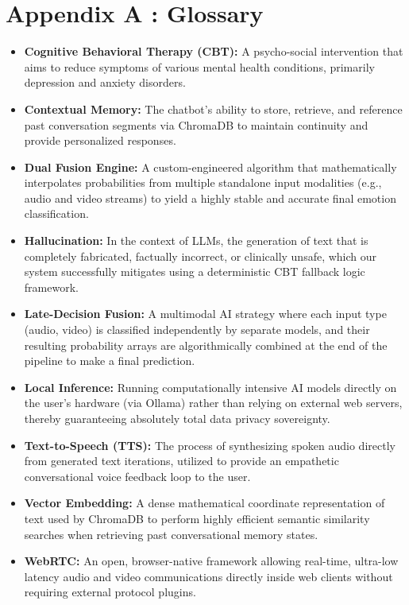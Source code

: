 \documentclass[11pt]{report}
\begin{document}
\chapter*{Appendix A : Glossary}
\begin{itemize}
    \item \textbf{Cognitive Behavioral Therapy (CBT):} A psycho-social intervention that aims to reduce symptoms of various mental health conditions, primarily depression and anxiety disorders.
    \item \textbf{Contextual Memory:} The chatbot's ability to store, retrieve, and reference past conversation segments via ChromaDB to maintain continuity and provide personalized responses.
    \item \textbf{Dual Fusion Engine:} A custom-engineered algorithm that mathematically interpolates probabilities from multiple standalone input modalities (e.g., audio and video streams) to yield a highly stable and accurate final emotion classification.
    \item \textbf{Hallucination:} In the context of LLMs, the generation of text that is completely fabricated, factually incorrect, or clinically unsafe, which our system successfully mitigates using a deterministic CBT fallback logic framework.
    \item \textbf{Late-Decision Fusion:} A multimodal AI strategy where each input type (audio, video) is classified independently by separate models, and their resulting probability arrays are algorithmically combined at the end of the pipeline to make a final prediction.
    \item \textbf{Local Inference:} Running computationally intensive AI models directly on the user's hardware (via Ollama) rather than relying on external web servers, thereby guaranteeing absolutely total data privacy sovereignty.
    \item \textbf{Text-to-Speech (TTS):} The process of synthesizing spoken audio directly from generated text iterations, utilized to provide an empathetic conversational voice feedback loop to the user.
    \item \textbf{Vector Embedding:} A dense mathematical coordinate representation of text used by ChromaDB to perform highly efficient semantic similarity searches when retrieving past conversational memory states.
    \item \textbf{WebRTC:} An open, browser-native framework allowing real-time, ultra-low latency audio and video communications directly inside web clients without requiring external protocol plugins.
\end{itemize}
\end{document}
